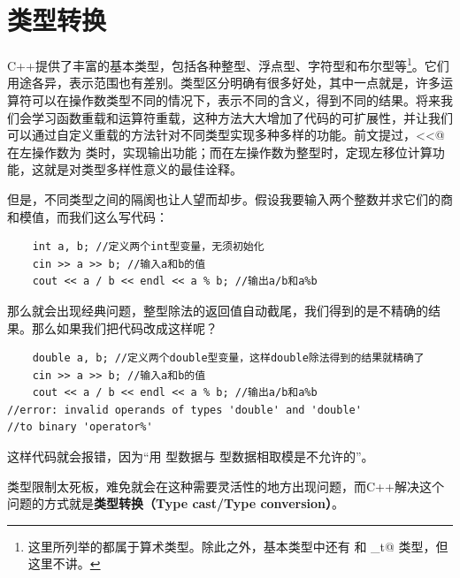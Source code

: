 \section{类型转换}
C++提供了丰富的基本类型，包括各种整型、浮点型、字符型和布尔型等\footnote{这里所列举的都属于算术类型。除此之外，基本类型中还有 \lstinline@void@ 和 \lstinline@nullptr_t@ 类型，但这里不讲。}。它们用途各异，表示范围也有差别。类型区分明确有很多好处，其中一点就是，许多运算符可以在操作数类型不同的情况下，表示不同的含义，得到不同的结果。将来我们会学习函数重载和运算符重载，这种方法大大增加了代码的可扩展性，并让我们可以通过自定义重载的方法针对不同类型实现多种多样的功能。前文提过，\lstinline@<<@ 在左操作数为 \lstinline@ostream@ 类时，实现输出功能；而在左操作数为整型时，定现左移位计算功能，这就是对类型多样性意义的最佳诠释。\par
但是，不同类型之间的隔阂也让人望而却步。假设我要输入两个整数并求它们的商和模值，而我们这么写代码：
\begin{lstlisting}
    int a, b; //定义两个int型变量，无须初始化
    cin >> a >> b; //输入a和b的值
    cout << a / b << endl << a % b; //输出a/b和a%b
\end{lstlisting}
那么就会出现经典问题，整型除法的返回值自动截尾，我们得到的是不精确的结果。那么如果我们把代码改成这样呢？
\begin{lstlisting}
    double a, b; //定义两个double型变量，这样double除法得到的结果就精确了
    cin >> a >> b; //输入a和b的值
    cout << a / b << endl << a % b; //输出a/b和a%b
//error: invalid operands of types 'double' and 'double'
//to binary 'operator%'
\end{lstlisting}
这样代码就会报错，因为``用 \lstinline@double@ 型数据与 \lstinline@double@ 型数据相取模是不允许的''。\par
类型限制太死板，难免就会在这种需要灵活性的地方出现问题，而C++解决这个问题的方式就是\textbf{类型转换（Type cast/Type conversion）}。\par
